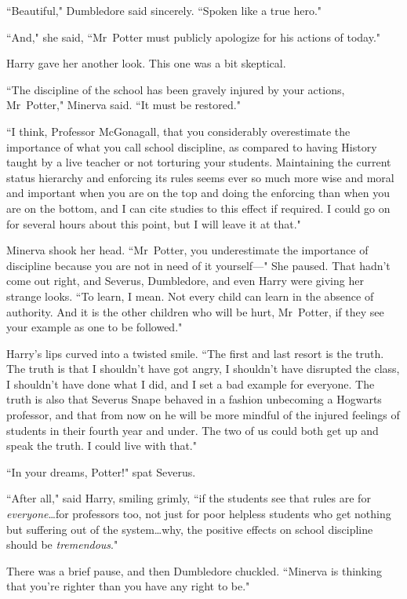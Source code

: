 ``Beautiful," Dumbledore said sincerely. ``Spoken like a true hero."

``And," she said, ``Mr~Potter must publicly apologize for his actions of today."

Harry gave her another look. This one was a bit skeptical.

``The discipline of the school has been gravely injured by your actions, Mr~Potter," Minerva said. ``It must be restored."

``I think, Professor McGonagall, that you considerably overestimate the importance of what you call school discipline, as compared to having History taught by a live teacher or not torturing your students. Maintaining the current status hierarchy and enforcing its rules seems ever so much more wise and moral and important when you are on the top and doing the enforcing than when you are on the bottom, and I can cite studies to this effect if required. I could go on for several hours about this point, but I will leave it at that."

Minerva shook her head. ``Mr~Potter, you underestimate the importance of discipline because you are not in need of it yourself—" She paused. That hadn't come out right, and Severus, Dumbledore, and even Harry were giving her strange looks. ``To learn, I mean. Not every child can learn in the absence of authority. And it is the other children who will be hurt, Mr~Potter, if they see your example as one to be followed."

Harry's lips curved into a twisted smile. ``The first and last resort is the truth. The truth is that I shouldn't have got angry, I shouldn't have disrupted the class, I shouldn't have done what I did, and I set a bad example for everyone. The truth is also that Severus Snape behaved in a fashion unbecoming a Hogwarts professor, and that from now on he will be more mindful of the injured feelings of students in their fourth year and under. The two of us could both get up and speak the truth. I could live with that."

``In your dreams, Potter!" spat Severus.

``After all," said Harry, smiling grimly, ``if the students see that rules are for \emph{everyone}…for professors too, not just for poor helpless students who get nothing but suffering out of the system…why, the positive effects on school discipline should be \emph{tremendous}."

There was a brief pause, and then Dumbledore chuckled. ``Minerva is thinking that you're righter than you have any right to be."

